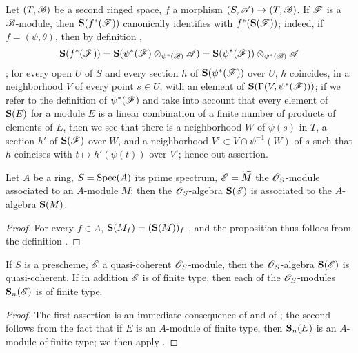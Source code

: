 \begin{env}[1.7.5]
\label{II.1.7.5}
Let $(T,\mathscr{B})$ be a second ringed space, $f$ a morphism $(S,\sh{A})\to(T,\sh{B})$.
If $\mathscr{F}$ is a $\mathscr{B}$-module, then $\mathbf{S}(f^*(\mathscr{F}))$ canonically identifies with $f^*(\mathbf{S}(\mathscr{F}))$; indeed, if $f=(\psi,\theta)$, then by definition ,
\[
  \mathbf{S}(f^*(\mathscr{F}))=\mathbf{S}(\psi^*(\mathscr{F})\otimes_{\psi^*(\mathscr{B})}\mathscr{A})=\mathbf{S}(\psi^*(\mathscr{F}))\otimes_{\psi^*(\mathscr{B})}\mathscr{A}
\]
; for every open $U$ of $S$ and every section $h$ of $\mathbf{S}(\psi^*(\mathscr{F}))$ over $U$, $h$ coincides, in a neighborhood $V$ of every point $s\in U$, with an element of $\mathbf{S}(\Gamma(V,\psi^*(\mathscr{F})))$; if we refer to the definition of $\psi^*(\mathscr{F})$  and take into account that every element of $\mathbf{S}(E)$ for a module $E$ is a linear combination of a finite number of products of elements of $E$, then we see that there is a neighborhood $W$ of $\psi(s)$ in $T$, a section $h'$ of $\mathbf{S}(\mathscr{F})$ over $W$, and a neighborhood $V'\subset V\cap\psi^{-1}(W)$ of $s$ such that $h$ coincises with $t\mapsto h'(\psi(t))$ over $V'$; hence out assertion.
\end{env}

\begin{proposition}[1.7.6]
\label{II.1.7.6}
Let $A$ be a ring, $S=\operatorname{Spec}(A)$ its prime spectrum, $\mathscr{E}=\widetilde{M}$ the $\mathscr{O}_S$-module associated to an $A$-module $M$; then the $\mathscr{O}_S$-algebra $\mathbf{S}(\mathscr{E})$ is associated to the $A$-algebra $\mathbf{S}(M)$.
\end{proposition}

\begin{proof}
For every $f\in A$, $\mathbf{S}(M_f)=(\mathbf{S}(M))_f$ , and the proposition thus folloes from the definition .
\end{proof}

\begin{corollary}[1.7.7]
\label{II.1.7.7}
If $S$ is a prescheme, $\mathscr{E}$ a quasi-coherent $\mathscr{O}_S$-module, then the $\mathscr{O}_S$-algebra $\mathbf{S}(\mathscr{E})$ is quasi-coherent.
If in addition $\mathscr{E}$ is of finite type, then each of the $\mathscr{O}_S$-modules $\mathbf{S}_n(\mathscr{E})$ is of finite type.
\end{corollary}

\begin{proof}
The first assertion is an immediate consequence of  and of ; the second follows from the fact that if $E$ is an $A$-module of finite type, then $\mathbf{S}_n(E)$ is an $A$-module of finite type; we then apply .
\end{proof}

